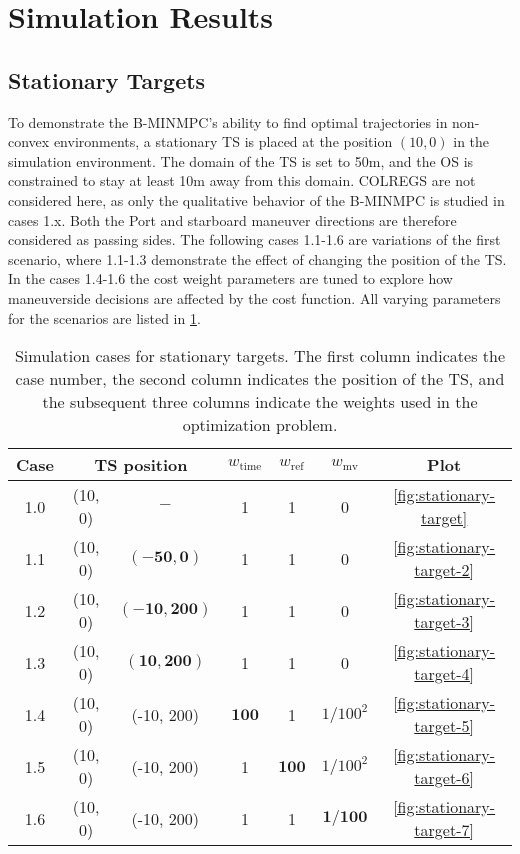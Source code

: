 \section{Simulation Results}\label{sec:simulation-results}

\subsection{Stationary Targets}
\label{sec:case-1-stationary-targets}

To demonstrate the B-MINMPC's ability to find optimal trajectories in non-convex environments, a stationary TS is placed at the position $(10, 0)$ in the simulation environment. The domain of the TS is set to 50m, and the OS is constrained to stay at least 10m away from this domain. COLREGS are not considered here, as only the qualitative behavior of the B-MINMPC is studied in cases 1.x. Both the Port and starboard maneuver directions are therefore considered as passing sides. The following cases 1.1-1.6 are variations of the first scenario, where 1.1-1.3 demonstrate the effect of changing the position of the TS. In the cases 1.4-1.6 the cost weight parameters are tuned to explore how maneuverside decisions are affected by the cost function. 
All varying parameters for the scenarios are listed in \cref{tab:stationary-targets}.


\begin{table}
    \centering
    \begin{tabular}{|c|c|c|c|c|c|c|}
        \hline
        Case & \multicolumn{2}{c|}{TS position} & $w_\text{time}$ & $w_\text{ref}$ & $w_\text{mv}$ & Plot \\
        \hline
        1.0 & (10, 0) & $-$ & 1 & 1 & 0 & \cref{fig:stationary-target} \\
        \hline
        1.1 & (10, 0) & $\mathbf{(-50, 0)}$ & 1 & 1 & 0 & \cref{fig:stationary-target-2} \\
        \hline
        1.2 & (10, 0) & $\mathbf{(-10, 200)}$ & 1 & 1 & 0 & \cref{fig:stationary-target-3} \\
        \hline
        1.3 & (10, 0) & $\mathbf{(10, 200)}$ & 1 & 1 & 0 & \cref{fig:stationary-target-4} \\
        \hline
        1.4 & (10, 0) & (-10, 200) & $\mathbf{100}$ & 1 & $1/100^2$ & \cref{fig:stationary-target-5} \\
        \hline
        1.5 & (10, 0) & (-10, 200) & 1 & $\mathbf{100}$ & $1/100^2$ & \cref{fig:stationary-target-6} \\
        \hline
        1.6 & (10, 0) & (-10, 200) & 1 & 1 & $\mathbf{1/100}$ & \cref{fig:stationary-target-7} \\
        \hline
    \end{tabular}
    \caption{Simulation cases for stationary targets. The first column indicates the case number, the second column indicates the position of the TS, and the subsequent three columns indicate the weights used in the optimization problem.}
    \label{tab:stationary-targets}
\end{table}


